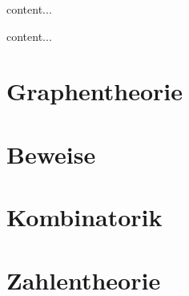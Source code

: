 \begin{definition}[Kardinalitäten]
	content...
\end{definition}

\begin{definition}[Multimenge]
	content...
\end{definition}

\section{Graphentheorie}

\section{Beweise}

\section{Kombinatorik}

\section{Zahlentheorie}

